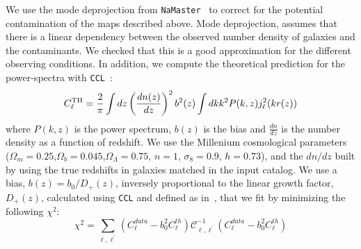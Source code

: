 \documentclass[twocolumn]{aastex62}
\begin{document}
We use the mode deprojection from \texttt{NaMaster}~\citep{2019MNRAS.484.4127A} to correct for the potential contamination of the maps described above. Mode deprojection, assumes that there is a linear dependency between the observed number density of galaxies and the contaminants. We checked that this is a good approximation for the different observing conditions. In addition, we compute the theoretical prediction for the power-spectra with \texttt{CCL}~\citep{2019ApJS..242....2C}:
\begin{equation}
C_{\ell}^{\rm TH} = \frac{2}{\pi}\int{dz} \left(\frac{dn(z)}{dz}\right)^{2} b^{2}(z) \int{dk k^{2} P(k,z)j^{2}_{\ell}(kr(z))}
\end{equation}
where $P(k,z)$ is the power spectrum, $b(z)$ is the bias and $\frac{dn}{dz}$ is the number density as a function of redshift. We use the Millenium cosmological parameters~\citep{2005Nature.435.629S} ($\Omega_{m}=0.25$,$\Omega_{b}=0.045$,$\Omega_{\Lambda}=0.75$, $n=1$, $\sigma_{8}=0.9$, $h=0.73$), and the $dn/dz$ built by using the true redshifts in galaxies matched in the input catalog. We use a bias, $b(z) = b_{0}/D_{+}(z)$, inversely proportional to the linear growth factor, $D_{+}(z)$, calculated using \texttt{CCL} and defined as in~\citet{2019ApJS..242....2C}, that we fit by minimizing the following $\chi^{2}$:
\begin{equation}
\chi^{2}=\sum_{\ell,\ell^{\prime}}\left(C_{\ell}^{data}-b_{0}^{2} C_{\ell}^{th}\right)\mathcal{C}_{\ell,\ell^{\prime}}^{-1}\left(C_{\ell}^{data}-b_{0}^{2} C_{\ell}^{th}\right)
\end{equation}
\end{document}
